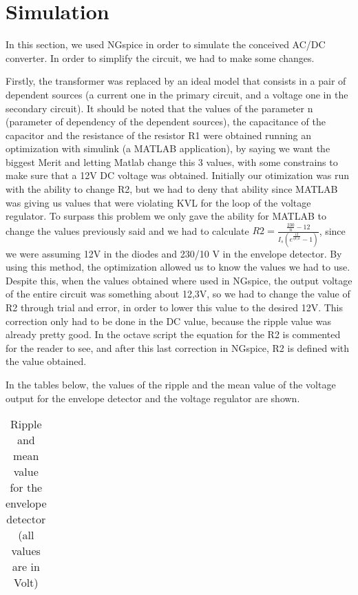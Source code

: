 \section{Simulation}
\label{sec:simulation}

\par In this section, we used NGspice in order to simulate the conceived AC/DC converter. In order to simplify the circuit, we had to make some changes.
\par Firstly, the transformer was replaced by an ideal model that consists in a pair of dependent sources (a current one in the primary circuit, and a voltage one in the secondary circuit). It should be noted that the values of the parameter n (parameter of dependency of the dependent sources), the capacitance of the capacitor and the resistance of the resistor R1 were obtained running an optimization with simulink (a MATLAB application), by saying we want the biggest Merit and letting Matlab change this 3 values, with some constrains to make sure that a 12V DC voltage was obtained. Initially our otimization was run with the ability to change R2, but we had to deny that ability since MATLAB was giving us values that were violating KVL for the loop of the voltage regulator. To surpass this problem we only gave the ability for MATLAB to change the values previously said and we had to calculate $R2 = \frac{\frac{230}{n}-12}{I_s(e^{\frac{12}{\eta V_tk}}-1)}$, since we were assuming 12V in the diodes and 230/10 V in the envelope detector. By using this method, the optimization allowed us to know the values we had to use. Despite this, when the values obtained where used in NGspice, the output voltage of the entire circuit was something about 12,3V, so we had to change the value of R2 through trial and error, in order to lower this value to the desired 12V. This correction only had to be done in the DC value, because the ripple value was already pretty good. In the octave script the equation for the R2 is commented for the reader to see, and after this last correction in NGspice, R2 is defined with the value obtained.
\par In the tables below, the values of the ripple and the mean value of the voltage output for the envelope detector and the voltage regulator are shown.

\vspace{5mm}
\begin{table}[h!]
\centering
\begin{tabularx}{0.9\textwidth} {
  | >{\raggedright\arraybackslash}X
  | >{\raggedleft\arraybackslash}X | }
 \hline

\end{tabularx}
\caption{\label{tab:Table 4} Ripple and mean value for the envelope detector (all values are in Volt)}
\end{table}
\vspace{5mm}

